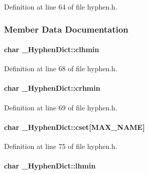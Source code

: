 \-Definition at line 64 of file hyphen.\-h.



\subsubsection{\-Member \-Data \-Documentation}
\hypertarget{struct___hyphen_dict_a651eac97882c11ba2416f21ab8a4ed79}{
\paragraph[{clhmin}]{\setlength{\rightskip}{0pt plus 5cm}char {\bf \-\_\-\-Hyphen\-Dict\-::clhmin}}}\label{struct___hyphen_dict_a651eac97882c11ba2416f21ab8a4ed79}


\-Definition at line 68 of file hyphen.\-h.

\hypertarget{struct___hyphen_dict_a32f506e9ca1f4746acb0c41b33887e80}{
\paragraph[{crhmin}]{\setlength{\rightskip}{0pt plus 5cm}char {\bf \-\_\-\-Hyphen\-Dict\-::crhmin}}}\label{struct___hyphen_dict_a32f506e9ca1f4746acb0c41b33887e80}


\-Definition at line 69 of file hyphen.\-h.

\hypertarget{struct___hyphen_dict_a53f12e09d8005867c7cbcc91a88befea}{
\paragraph[{cset}]{\setlength{\rightskip}{0pt plus 5cm}char {\bf \-\_\-\-Hyphen\-Dict\-::cset}\mbox{[}{\bf \-M\-A\-X\-\_\-\-N\-A\-M\-E}\mbox{]}}}\label{struct___hyphen_dict_a53f12e09d8005867c7cbcc91a88befea}


\-Definition at line 75 of file hyphen.\-h.

\hypertarget{struct___hyphen_dict_abadeccbce027b36645841686ad93d067}{
\paragraph[{lhmin}]{\setlength{\rightskip}{0pt plus 5cm}char {\bf \-\_\-\-Hyphen\-Dict\-::lhmin}}}\label{struct___hyphen_dict_abadeccbce027b36645841686ad93d067}


